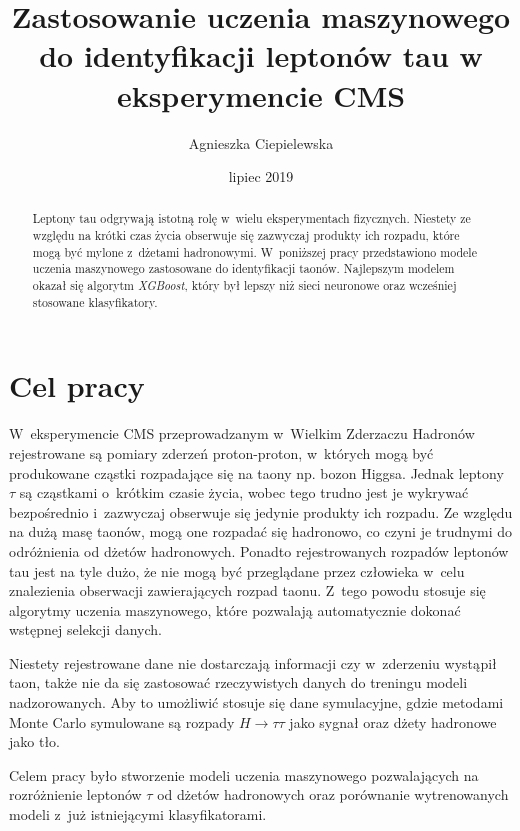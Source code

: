 \documentclass{pracalicmgr}
\author{Agnieszka Ciepielewska}
\title{Zastosowanie uczenia maszynowego do identyfikacji leptonów tau w eksperymencie CMS}
\date{lipiec 2019}
\begin{document}
    \maketitle
    \let\cleardoublepage\clearpage
    
    \begin{abstract}
    Leptony tau	odgrywają istotną rolę w~wielu eksperymentach fizycznych. Niestety ze względu na krótki czas życia obserwuje się zazwyczaj produkty ich rozpadu, które mogą być mylone z~dżetami hadronowymi. W~poniższej pracy przedstawiono modele uczenia maszynowego zastosowane do identyfikacji taonów. Najlepszym modelem okazał się algorytm \textit{XGBoost}, który był lepszy niż sieci neuronowe oraz wcześniej stosowane klasyfikatory.

    \end{abstract}

    \tableofcontents
    
    \chapter*{Cel pracy}
    W~eksperymencie CMS przeprowadzanym w~Wielkim Zderzaczu Hadronów rejestrowane są pomiary zderzeń proton-proton, w~których mogą być produkowane cząstki rozpadające się na taony np. bozon Higgsa. Jednak leptony $\tau$ są cząstkami o~krótkim czasie życia, wobec tego trudno jest je wykrywać bezpośrednio i~zazwyczaj obserwuje się jedynie produkty ich rozpadu. Ze względu na dużą masę taonów, mogą one rozpadać się hadronowo, co czyni je trudnymi do odróżnienia od dżetów hadronowych. Ponadto rejestrowanych rozpadów leptonów tau jest na tyle dużo, że nie mogą być przeglądane przez człowieka w~celu znalezienia obserwacji zawierających rozpad taonu. Z~tego powodu stosuje się algorytmy uczenia maszynowego, które pozwalają automatycznie dokonać wstępnej selekcji danych.
    
    Niestety rejestrowane dane nie dostarczają informacji czy w~zderzeniu wystąpił taon, także nie da się zastosować rzeczywistych danych do treningu modeli nadzorowanych. Aby to umożliwić stosuje się dane symulacyjne, gdzie metodami Monte Carlo symulowane są rozpady $H \rightarrow \tau\tau$ jako sygnał oraz dżety hadronowe jako tło.
    
    Celem pracy było stworzenie modeli uczenia maszynowego pozwalających na rozróżnienie leptonów $\tau$ od dżetów hadronowych oraz porównanie wytrenowanych modeli z~już istniejącymi klasyfikatorami.
    
\end{document}
